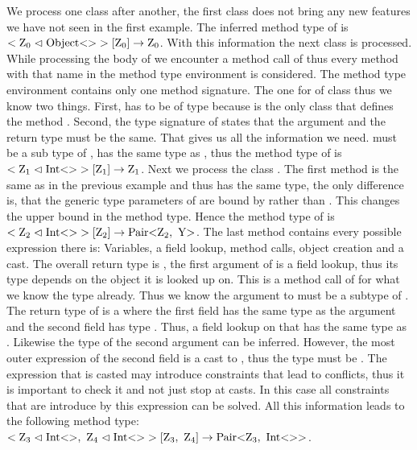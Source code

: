 We process one class after another, the first class does not bring any new features we have not seen in the first example. The inferred method type of  is $<\text{Z}_{0} \vartriangleleft \text{Object} \text{<}  \text{>}>[\text{Z}_{0}] \to \text{Z}_{0}$.
With this information the next class  is processed. While processing the body of  we encounter a method call of  thus every method with that name in the method type environment is considered. The method type environment
contains only one method signature. The one for  of class  thus we know two things. First,  has to be of type  because  is the only class that defines the method . Second, the type signature of  states that the argument and the return type must be the same.
That gives us all the information we need.  must be a sub type of ,  has the same type as , thus the method type of  is $<\text{Z}_{1} \vartriangleleft \text{Int} \text{<}  \text{>}>[\text{Z}_{1}] \to \text{Z}_{1}$.
Next we process the class . The first method  is the same as in the previous example and thus has the same type, the only difference is, that the generic type parameters of  are bound by  rather than .
This changes the upper bound in the method type. Hence the method type of  is $<\xa{Z}{2} \vartriangleleft \nvtt{Int}{}>[\xa{Z}{2}] \to \nvtt{Pair}{\xa{Z}{2}, \ \text{Y}}$.
The last method  contains every possible expression there is: Variables, a field lookup, method calls, object creation and a cast.
The overall return type is , the first argument of  is a field lookup, thus its type depends on the object it is looked up on. This is a method call of  for what we know the type already. Thus we know the argument to   must be a subtype of . The return type of  is a  where the first field has the same type as the argument  and the second field has type .
Thus, a field lookup  on that  has the same type as . Likewise the type of the second argument can be inferred. However, the most outer expression of the second field is a cast to , thus the type must be .
The expression that is casted may introduce constraints that lead to conflicts, thus it is important to check it and not just stop at casts. In this case all constraints that are introduce by this expression can be solved.
All this information leads to the following method type: $<\text{Z}_{3} \vartriangleleft \text{Int} \text{<}  \text{>}, \ \text{Z}_{4} \vartriangleleft \text{Int} \text{<}  \text{>}>[\text{Z}_{3}, \ \text{Z}_{4}] \to \text{Pair} \text{<} \text{Z}_{3}, \ \text{Int} \text{<}  \text{>} \text{>}$.
